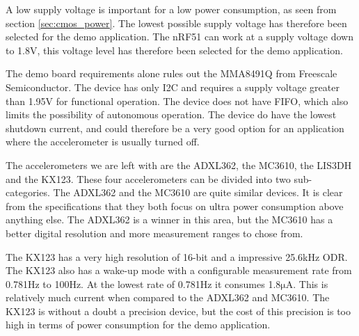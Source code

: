 A low supply voltage is important for a low power consumption, as seen from section \ref{sec:cmos_power}. The lowest possible supply voltage has therefore been selected for the demo application. The nRF51 can work at a supply voltage down to 1.8V, this voltage level has therefore been selected for the demo application.

The demo board requirements alone rules out the MMA8491Q from Freescale Semiconductor. The device has only I2C and requires a supply voltage greater than 1.95V for functional operation. The device does not have FIFO, which also limits the possibility of autonomous operation. The device do have the lowest shutdown current, and could therefore be a very good option for an application where the accelerometer is usually turned off. 

The accelerometers we are left with are the ADXL362, the MC3610, the LIS3DH and the KX123. These four accelerometers can be divided into two sub-categories. The ADXL362 and the MC3610 are quite similar devices. It is clear from the specifications that they both focus on ultra power consumption above anything else. The ADXL362 is a winner in this area, but the MC3610 has a better digital resolution and more measurement ranges to chose from.

The KX123 has a very high resolution of 16-bit and a impressive 25.6kHz ODR. The KX123 also has a wake-up mode with a configurable measurement rate from 0.781Hz to 100Hz. At the lowest rate of 0.781Hz it consumes 1.8$\si{\micro\ampere}$. This is relatively much current when compared to the ADXL362 and MC3610. The KX123 is without a doubt a precision device, but the cost of this precision is too high in terms of power consumption for the demo application.